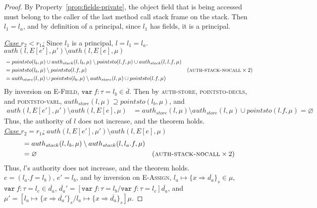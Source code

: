 \documentclass{llncs}
\newcommand{\keywadj}[1]{\mathtt{#1}}
\newcommand{\keyw}[1]{\keywadj{#1}~}
\begin{document}
\begin{proof}
By Property~\ref{prop:fields-private}, the object field that is being accessed must belong to the caller of the last method call stack frame on the stack. Then $l_1 = l_a$, and by definition of a principal, since $l_1$ has fields, it is a principal.

\noindent\underline{\underline{\textit{Case $r_2 < r_1$:}}} Since $l_1$ is a principal, $l = l_1 = l_a$.\\
\noindent$auth(l, E[e'], \mu') \setminus auth(l, E[e], \mu)$
\vspace{-7pt}
\begin{align*}
&= pointsto(l_b, \mu) \cup auth_{stack}(l, l_b, \mu) \setminus pointsto(l.f, \mu) \cup auth_{stack}(l, l.f, \mu)\\
&= pointsto(l_b, \mu) \setminus pointsto(l.f, \mu) & (\textsc{auth-stack-nocall} \times 2)\\
&= auth_{store}(l, \mu) \cup pointsto(l_b, \mu) \setminus auth_{store}(l, \mu) \cup pointsto(l.f, \mu)
\end{align*}
By inversion on \textsc{E-Field}, $\keyw{var} f : \tau = l_b \in \overline{d}$. Then by \textsc{auth-store}, \textsc{pointsto-decls}, and \textsc{pointsto-varl}, $auth_{store}(l, \mu) \supseteq pointsto(l_b, \mu)$, and
\begin{align*}
auth(l, E[e'], \mu') \setminus auth(l, E[e], \mu) &= auth_{store}(l, \mu) \setminus auth_{store}(l, \mu) \cup pointsto(l.f, \mu) = \varnothing
\end{align*}
Thus, the authority of $l$ does not increase, and the theorem holds.\\

\noindent\underline{\underline{\textit{Case $r_2 = r_1$:}}} $auth(l, E[e'], \mu') \setminus auth(l, E[e], \mu)$
\vspace{-7pt}
\begin{align*}
&= auth_{stack}(l, l_b, \mu) \setminus auth_{stack}(l, l_a.f, \mu)\\ 
&= \varnothing & (\textsc{auth-stack-nocall} \times 2)
\end{align*}
Thus, $l$'s authority does not increase, and the theorem holds.\\


\noindent{}
$e = (l_a.f = l_b)$, $e' = l_b$, and by inversion on \textsc{E-Assign}, $l_a \mapsto \{ x \Rightarrow \overline{d_a} \}_{s} \in \mu$, \mbox{$\keyw{var} f : \tau = l_c \in \overline{d_a}$}, $\overline{d_a}' = [\keyw{var} f : \tau = l_b/\keyw{var} f : \tau = l_c]\overline{d_a}$, and $\mu' = [l_a \mapsto \{ x \Rightarrow \overline{d_a}' \}_{s}/l_a \mapsto \{ x \Rightarrow \overline{d_a} \}_{s}]\mu$.


\end{proof}
\end{document}
